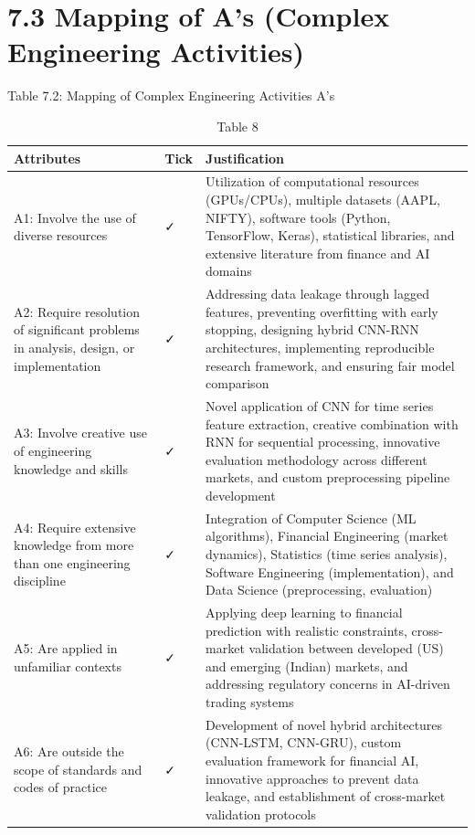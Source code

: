 \documentclass[12pt,a4paper]{report}
\begin{document}
\section{7.3 Mapping of A's (Complex Engineering Activities)}
Table 7.2: Mapping of Complex Engineering Activities A’s

\begin{table}[htbp]
\centering
\begin{tabular}{|l|l|l|}
\hline
\textbf{Attributes} & \textbf{Tick} & \textbf{Justification} \\
\hline
A1: Involve the use of diverse resources & ✓ & Utilization of computational resources (GPUs/CPUs), multiple datasets (AAPL, NIFTY), software tools (Python, TensorFlow, Keras), statistical libraries, and extensive literature from finance and AI domains \\
\hline
A2: Require resolution of significant problems in analysis, design, or implementation & ✓ & Addressing data leakage through lagged features, preventing overfitting with early stopping, designing hybrid CNN-RNN architectures, implementing reproducible research framework, and ensuring fair model comparison \\
\hline
A3: Involve creative use of engineering knowledge and skills & ✓ & Novel application of CNN for time series feature extraction, creative combination with RNN for sequential processing, innovative evaluation methodology across different markets, and custom preprocessing pipeline development \\
\hline
A4: Require extensive knowledge from more than one engineering discipline & ✓ & Integration of Computer Science (ML algorithms), Financial Engineering (market dynamics), Statistics (time series analysis), Software Engineering (implementation), and Data Science (preprocessing, evaluation) \\
\hline
A5: Are applied in unfamiliar contexts & ✓ & Applying deep learning to financial prediction with realistic constraints, cross-market validation between developed (US) and emerging (Indian) markets, and addressing regulatory concerns in AI-driven trading systems \\
\hline
A6: Are outside the scope of standards and codes of practice & ✓ & Development of novel hybrid architectures (CNN-LSTM, CNN-GRU), custom evaluation framework for financial AI, innovative approaches to prevent data leakage, and establishment of cross-market validation protocols \\
\hline
\end{tabular}
\caption{Table 8}
\label{tab:table8}
\end{table}
\end{document}
